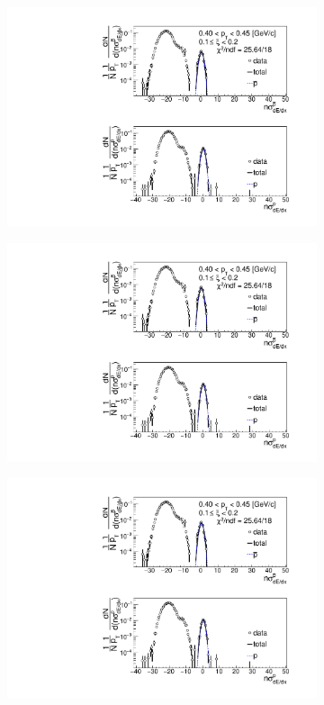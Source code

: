 \begin{figure}[h!]
\begin{subfigure}{.32\textwidth}
		\includegraphics[width=\linewidth, page=6]{chapters/chrgSTAR/img/dEdx/fit2019_thirdStep_2_2.pdf}
	\end{subfigure}
	\begin{subfigure}{.32\textwidth}
		\includegraphics[width=\linewidth, page=7]{chapters/chrgSTAR/img/dEdx/fit2019_thirdStep_2_2.pdf}
	\end{subfigure}
	\begin{subfigure}{.32\textwidth}
		\includegraphics[width=\linewidth, page=8]{chapters/chrgSTAR/img/dEdx/fit2019_thirdStep_2_2.pdf}

\end{subfigure}
\end{figure}
